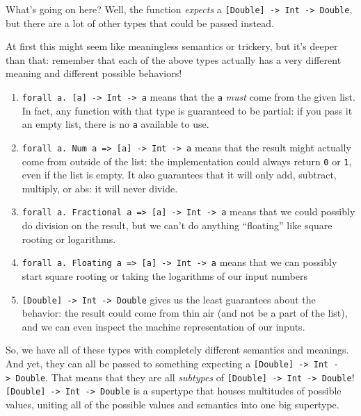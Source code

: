 \documentclass[]{article}
\begin{document}
What's going on here? Well, the function \emph{expects} a
\texttt{{[}Double{]}\ -\textgreater{}\ Int\ -\textgreater{}\ Double}, but there
are a lot of other types that could be passed instead.

At first this might seem like meaningless semantics or trickery, but it's deeper
than that: remember that each of the above types actually has a very different
meaning and different possible behaviors!

\begin{enumerate}
\def\labelenumi{\arabic{enumi}.}
\tightlist
\item
  \texttt{forall\ a.\ {[}a{]}\ -\textgreater{}\ Int\ -\textgreater{}\ a} means
  that the \texttt{a} \emph{must} come from the given list. In fact, any
  function with that type is guaranteed to be partial: if you pass it an empty
  list, there is no \texttt{a} available to use.
\item
  \texttt{forall\ a.\ Num\ a\ =\textgreater{}\ {[}a{]}\ -\textgreater{}\ Int\ -\textgreater{}\ a}
  means that the result might actually come from outside of the list: the
  implementation could always return \texttt{0} or \texttt{1}, even if the list
  is empty. It also guarantees that it will only add, subtract, multiply, or
  abs: it will never divide.
\item
  \texttt{forall\ a.\ Fractional\ a\ =\textgreater{}\ {[}a{]}\ -\textgreater{}\ Int\ -\textgreater{}\ a}
  means that we could possibly do division on the result, but we can't do
  anything ``floating'' like square rooting or logarithms.
\item
  \texttt{forall\ a.\ Floating\ a\ =\textgreater{}\ {[}a{]}\ -\textgreater{}\ Int\ -\textgreater{}\ a}
  means that we can possibly start square rooting or taking the logarithms of
  our input numbers
\item
  \texttt{{[}Double{]}\ -\textgreater{}\ Int\ -\textgreater{}\ Double} gives us
  the least guarantees about the behavior: the result could come from thin air
  (and not be a part of the list), and we can even inspect the machine
  representation of our inputs.
\end{enumerate}

So, we have all of these types with completely different semantics and meanings.
And yet, they can all be passed to something expecting a
\texttt{{[}Double{]}\ -\textgreater{}\ Int\ -\textgreater{}\ Double}. That means
that they are all \emph{subtypes} of
\texttt{{[}Double{]}\ -\textgreater{}\ Int\ -\textgreater{}\ Double}!
\texttt{{[}Double{]}\ -\textgreater{}\ Int\ -\textgreater{}\ Double} is a
supertype that houses multitudes of possible values, uniting all of the possible
values and semantics into one big supertype.
\end{document}
